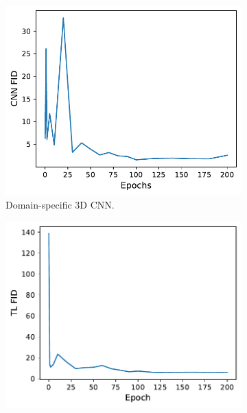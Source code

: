 \begin{figure}
    \centering
    \begin{subfigure}[t]{0.4\textwidth}
        \centering
        \hspace{-1cm} %
        \includegraphics[width=\textwidth]{chapter4/cnn_fid-epoch.pdf}
        \caption{
            Domain-specific 3D CNN.
        }
        \label{fig:custom_distance_vs_epochs}
    \end{subfigure}
    \hfill
    \begin{subfigure}[t]{0.4\textwidth}
        \centering
        \hspace{-1cm} %
        \includegraphics[width=\textwidth]{chapter4/tr_learning-epoch.pdf}

\end{subfigure}
\end{figure}
